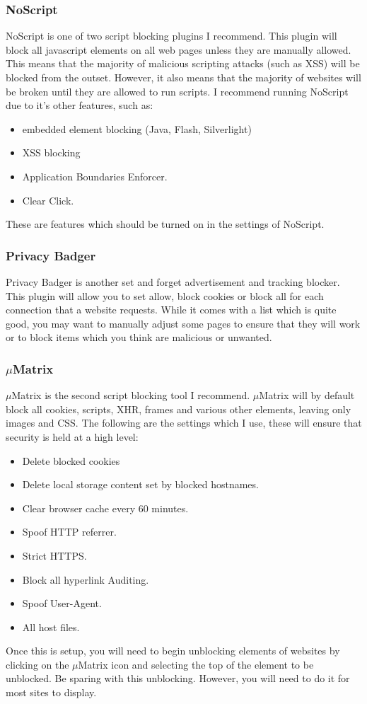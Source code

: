 \documentclass[a4paper,11pt]{report}
\begin{document}
		\subsubsection{NoScript}
			NoScript is one of two script blocking plugins I recommend. 
			This plugin will block all javascript elements on all web pages unless they are manually allowed. 
			This means that the majority of malicious scripting attacks (such as XSS) will be blocked from the outset. 
			However, it also means that the majority of websites will be broken until they are allowed to run scripts. 
			I recommend running NoScript due to it's other features, such as:
			\begin{itemize}
				\item embedded element blocking (Java, Flash, Silverlight) 
				\item XSS blocking
				\item Application Boundaries Enforcer. 
				\item Clear Click. 
			\end{itemize}
			These are features which should be turned on in the settings of NoScript. 
		\subsubsection{Privacy Badger}
			Privacy Badger is another set and forget advertisement and tracking blocker. 
			This plugin will allow you to set allow, block cookies or block all for each connection that a website requests. 
			While it comes with a list which is quite good, you may want to manually adjust some pages to ensure that they will work or to block items which you think are malicious or unwanted. 
		\subsubsection{$\mu{}$Matrix}
			$\mu$Matrix is the second script blocking tool I recommend. 
			$\mu{}$Matrix will by default block all cookies, scripts, XHR, frames and various other elements, leaving only images and CSS. 
			The following are the settings which I use, these will ensure that security is held at a high level:
			\begin{itemize}
				\item Delete blocked cookies
				\item Delete local storage content set by blocked hostnames. 
				\item Clear browser cache every 60 minutes. 
				\item Spoof HTTP referrer. 
				\item Strict HTTPS.
				\item Block all hyperlink Auditing. 
				\item Spoof User-Agent. 
				\item All host files. 
			\end{itemize}
			Once this is setup, you will need to begin unblocking elements of websites by clicking on the $\mu{}$Matrix icon and selecting the top of the element to be unblocked. 
			Be sparing with this unblocking. However, you will need to do it for most sites to display. 
\end{document}
